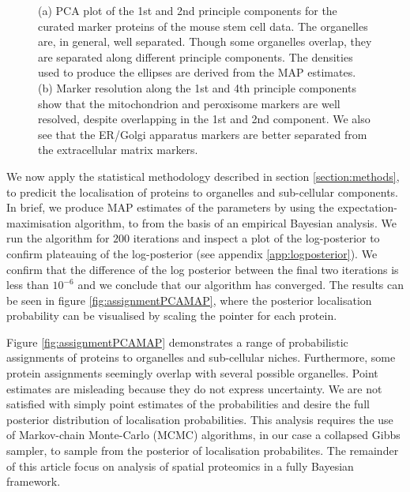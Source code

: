 \documentclass[12pt,english]{article}\usepackage[]{graphicx}\usepackage[]{color}
\newenvironment{knitrout}{}{} %
\begin{document}
\begin{figure}[ht]
\begin{subfigure}[t]{0.45\textwidth}
\begin{knitrout}
\end{knitrout}
        \caption{}
\end{subfigure}
  \centering
  \caption{ (a) PCA plot of the 1st and 2nd principle components for
    the curated marker proteins of the mouse stem cell data. The organelles
    are, in general, well separated. Though some organelles
    overlap, they are separated along different principle
    components. The densities used to produce the ellipses
    are derived from the MAP estimates. (b) Marker
    resolution along the 1st and 4th principle
    components show that the mitochondrion and peroxisome
    markers are well resolved, despite overlapping in the 1st and 2nd component.
    We also see that the ER/Golgi
        apparatus markers are better separated from the
    extracellular matrix markers.}
\label{figure::pcaellipse}
\end{figure}





We now apply the statistical methodology described in section \ref{section:methods},
to predicit the localisation of proteins to organelles and sub-cellular components.
In brief, we produce MAP estimates of the parameters by using the expectation-maximisation
algorithm, to from the basis of an empirical Bayesian analysis.
We run the algorithm for $200$ iterations and inspect a plot of the
log-posterior to confirm plateauing of the log-posterior (see appendix \ref{app:logposterior}). We confirm
that the difference of the log posterior between the final two iterations is less than $10^{-6}$
and we conclude that our algorithm has converged. The results can be seen in figure
\ref{fig:assignmentPCAMAP}, where the posterior localisation probability can be visualised by scaling the pointer
for each protein.

Figure \ref{fig:assignmentPCAMAP} demonstrates a range of probabilistic
assignments of proteins to organelles and sub-cellular niches. Furthermore, some protein assignments
seemingly overlap with several possible organelles. Point estimates are
misleading because they do not express uncertainty. We
are not satisfied with simply point estimates of the
probabilities and desire the full posterior distribution of localisation probabilities.
This analysis requires the use of Markov-chain Monte-Carlo (MCMC) algorithms, in our case a collapsed
Gibbs sampler, to sample from the posterior of localisation probabilites. The remainder of this
article focus on analysis of spatial proteomics in a fully Bayesian framework.
\end{document}
